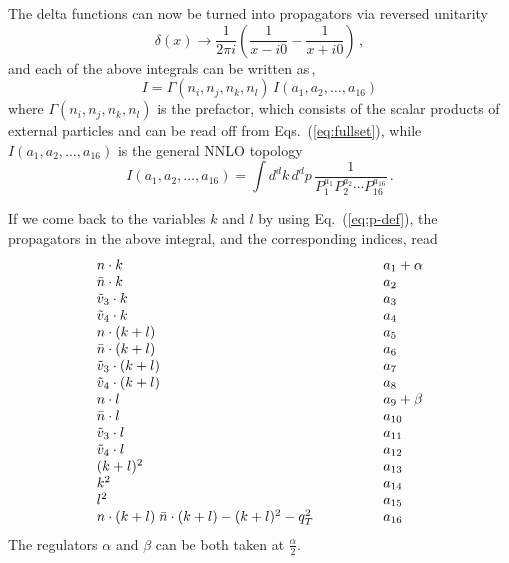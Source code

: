 \documentclass[a4paper,11pt]{report}
\numberwithin{equation}{section}
\begin{document}
The delta functions can now be turned into propagators via reversed unitarity
%
\begin{equation}
  \delta(x) \to \frac{1}{2\pi i} 
  \left(\frac{1}{x-i 0} - \frac{1}{x + i0}\right)\,,
\end{equation}
%
and each of the above integrals can be written as\,,
%
\begin{equation}
  I = \Gamma(n_i, n_j, n_k, n_l)\, I(a_1,a_2,\ldots, a_{16})
\end{equation}
%
where $\Gamma(n_i, n_j, n_k, n_l)$ is the prefactor, which consists of the
scalar products of external particles and can be read off from
Eqs.~(\ref{eq:fullset}), while $I(a_1,a_2,\ldots, a_{16})$ is the general NNLO
topology
%
\begin{equation}
  I(a_1,a_2,\ldots, a_{16}) = 
  \int d^d k\, d^d p\, 
  \frac{1}{P_1^{a_1}P_2^{a_2}\cdots P_{16}^{a_{16}}}\,.
  \label{eq:general-NNLO-topology}
\end{equation}
 
If we come back to the variables $k$ and $l$ by using Eq.~(\ref{eq:p-def}),
the propagators in the above integral, and the corresponding indices, read
%
\begin{equation}
  \begin{array}{lp{30pt}l}
  n \cdot k     & & a_1+\alpha \\
  \nbar \cdot k & & a_2 \\
  \tilde v_3 \cdot k   & & a_3 \\
  \tilde v_4 \cdot k   & & a_4 \\
  n \cdot (k+l)     & &  a_5  \\
  \nbar \cdot (k+l) & &  a_6 \\ 
  \tilde v_3 \cdot (k+l)   & &  a_7  \\
  \tilde v_4 \cdot (k+l)   & &  a_8  \\
  n \cdot l     & &  a_9 +\beta\\
  \nbar \cdot l & &  a_{10} \\
  \tilde v_3 \cdot l   & &  a_{11} \\
  \tilde v_4 \cdot l   & &  a_{12} \\
  (k+l)^2                             & & a_{13} \\
  k^2                             & & a_{14} \\
  l^2                         & & a_{15} \\
  n\cdot (k+l)\; \nbar \cdot (k+l) - (k+l)^2 -q_T^2 & & a_{16}
  \end{array}
  \label{eq:general-NNLO-propagators}
\end{equation}
%
The regulators $\alpha$ and $\beta$ can be both taken at $\frac{\alpha}{2}$.
\end{document}
